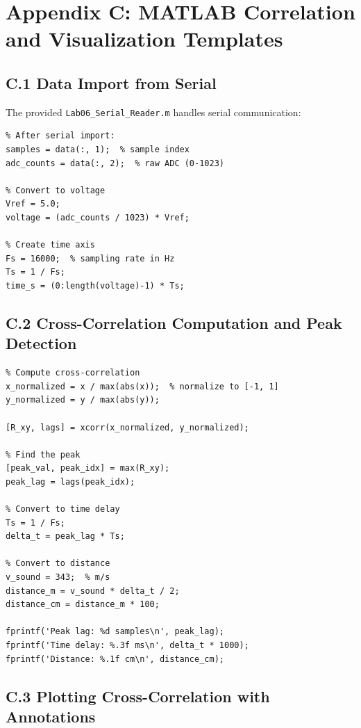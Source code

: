 \documentclass[11pt,letterpaper]{article}
\begin{document}
\section*{Appendix C: MATLAB Correlation and Visualization Templates}

\subsection*{C.1 Data Import from Serial}

The provided \texttt{Lab06\_Serial\_Reader.m} handles serial communication:

\begin{verbatim}
% After serial import:
samples = data(:, 1);  % sample index
adc_counts = data(:, 2);  % raw ADC (0-1023)

% Convert to voltage
Vref = 5.0;
voltage = (adc_counts / 1023) * Vref;

% Create time axis
Fs = 16000;  % sampling rate in Hz
Ts = 1 / Fs;
time_s = (0:length(voltage)-1) * Ts;
\end{verbatim}

\subsection*{C.2 Cross-Correlation Computation and Peak Detection}

\begin{verbatim}
% Compute cross-correlation
x_normalized = x / max(abs(x));  % normalize to [-1, 1]
y_normalized = y / max(abs(y));

[R_xy, lags] = xcorr(x_normalized, y_normalized);

% Find the peak
[peak_val, peak_idx] = max(R_xy);
peak_lag = lags(peak_idx);

% Convert to time delay
Ts = 1 / Fs;
delta_t = peak_lag * Ts;

% Convert to distance
v_sound = 343;  % m/s
distance_m = v_sound * delta_t / 2;
distance_cm = distance_m * 100;

fprintf('Peak lag: %d samples\n', peak_lag);
fprintf('Time delay: %.3f ms\n', delta_t * 1000);
fprintf('Distance: %.1f cm\n', distance_cm);
\end{verbatim}

\subsection*{C.3 Plotting Cross-Correlation with Annotations}
\end{document}
